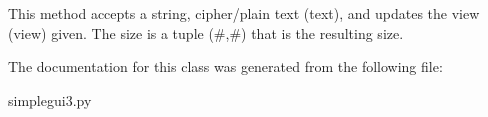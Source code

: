 \begin{DoxyVerb}    This method accepts a string, cipher/plain text (text), and updates the view (view) given.
    The size is a tuple (#,#) that is the resulting size.
\end{DoxyVerb}
 

The documentation for this class was generated from the following file\-:\begin{DoxyCompactItemize}
\item 
simplegui3.\-py\end{DoxyCompactItemize}
